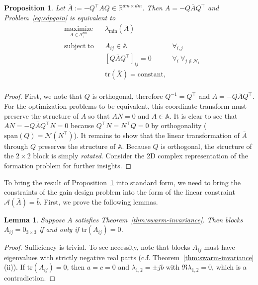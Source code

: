\documentclass[a4paper]{article}
\newtheorem{prop}{Proposition}
\newtheorem{lem}{Lemma}
\begin{document}
\begin{prop}\label{prop:sdpequiv}
Let $\bar{A}:=-Q^\top A Q\in\mathbb{R}^{dm\times dm}$. Then $A=-Q\bar{A}Q^\top$ and Problem~\eqref{eq:sdpgain} is equivalent to 
\begin{equation*}
\begin{aligned}
& \underset{\bar{A}\in\mathcal{S}^{dm}_+}{\mathrm{maximize}}
& & \lambda_{\mathrm{min}} \left( \bar{A} \right) & \\
& \mathrm{subject\; to}
& & \bar{A}_{ij} \in \mathbb{A}  & \forall_{i,j} \\
&&& \left[Q\bar{A}Q^\top\right]_{ij} = 0 \;   & \forall_{i} \ \forall_{j \notin \mathcal{N}_i} \\
&&& \mathrm{tr}(\bar{X}) = \mathrm{constant}, \\
\end{aligned}
\end{equation*}
\end{prop}
\begin{proof}
First, we note that $Q$ is orthogonal, therefore $Q^{-1}=Q^\top$ and $A=-Q\bar{A}Q^\top$.
For the optimization problems to be equivalent, this coordinate transform must preserve the structure of $A$ so that $AN=0$ and $A\in\mathbb{A}$.
It is clear to see that $AN = -Q\bar{A}Q^\top N = 0$ because $Q^\top N=N^\top Q = 0$ by orthogonality ($\text{span}(Q)=\mathcal{N}(N^\top)$).
It remains to show that the linear transformation of $\bar{A}$ through $Q$ preserves the structure of $\mathbb{A}$.
Because $Q$ is orthogonal, the structure of the $2\times 2$ block is simply \textit{rotated}.
Consider the 2D complex representation of the formation problem for further insights.
\end{proof}

To bring the result of Proposition~\ref{prop:sdpequiv} into standard form, we need to bring the constraints of the gain design problem into the form of the linear constraint $\mathcal{A}(\bar{A})=\bar{b}$.
First, we prove the following lemmas.

\begin{lem}\label{lem:trzero}
Suppose $A$ satisfies Theorem~\ref{thm:swarm-invariance}.
Then blocks $A_{ij}=0_{3\times 3}$ if and only if $\mathrm{tr}(A_{ij})=0$.
\end{lem}
\begin{proof}
Sufficiency is trivial.
To see necessity, note that blocks $A_{ij}$ must have eigenvalues with strictly negative real parts (c.f. Theorem~\ref{thm:swarm-invariance} (ii)).
If $\mathrm{tr}(A_{ij})=0$, then $a=c=0$ and $\lambda_{1,2} = \pm jb$ with $\Re{\lambda_{1,2}}=0$, which is a contradiction.
\end{proof}
\end{document}
